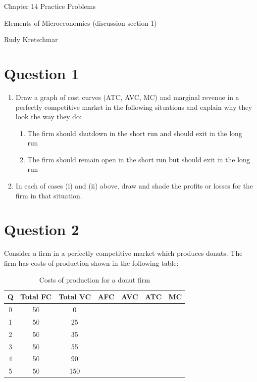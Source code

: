 \documentclass[12pt]{article}
\begin{document}
\begin{center}
\Large Chapter 14 Practice Problems

\medskip

\normalsize Elements of Microeconomics (discussion section 1)

\medskip

\small Rudy Kretschmar
\end{center}

\section*{Question 1}
\begin{enumerate}[label = (\alph*)]
    \item Draw a graph of cost curves (ATC, AVC, MC) and marginal revenue in a perfectly competitive market in the following situations and explain why they look the way they do:
\begin{enumerate}[label = (\roman*)]
    \item The firm should shutdown in the short run and should exit in the long run
    \item The firm should remain open in the short run but should exit in the long run
\end{enumerate}
    \item In each of cases (i) and (ii) above, draw and shade the profits or losses for the firm in that situation.
\end{enumerate}

\section*{Question 2}
Consider a firm in a perfectly competitive market which produces donuts. The firm has costs of production shown in the following table:

\begin{table}[H]
    \centering
    \begin{tabular}{ccccccc}
    \hline
        Q & Total FC & Total VC & AFC & AVC & ATC & MC \\
        \hline
        \hline
         0 & 50 & 0 & & & &  \\
         1 & 50 & 25 & & & & \\
         2 & 50 & 35 & & & &  \\
         3 & 50 & 55 & & & &  \\
         4 & 50 & 90 & & & &  \\
         5 & 50 & 150 & & & & \\
         \hline
    \end{tabular}
    \caption{Costs of production for a donut firm}
    \label{tab:placeholder}
\end{table}
\end{document}

